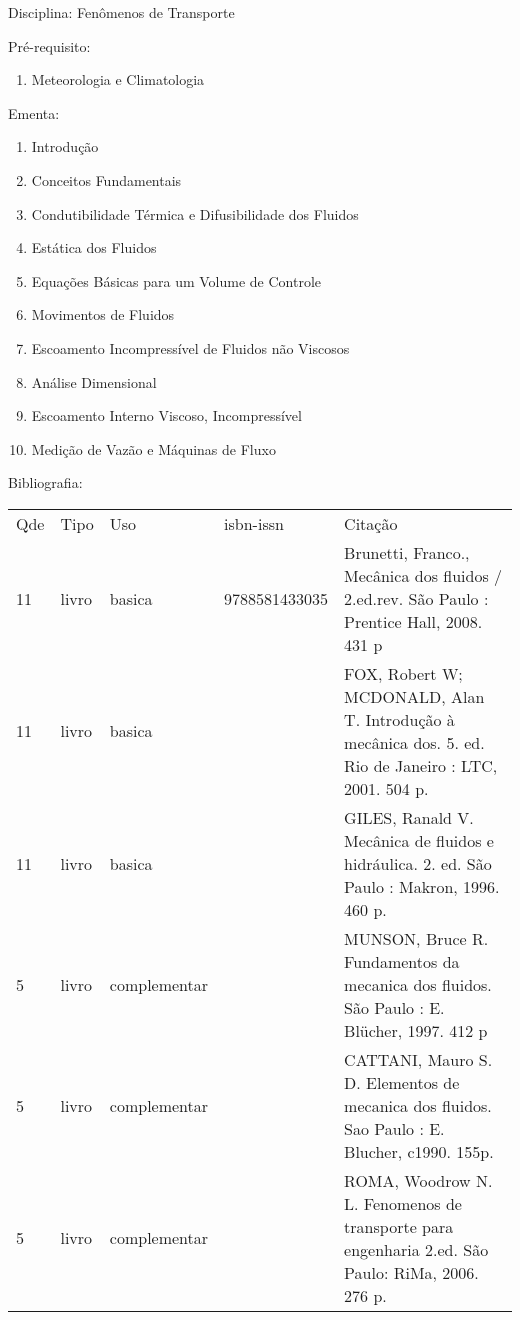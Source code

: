 \documentclass[12pt,a4paper,twoside]{report}
\begin{document}
Disciplina: Fenômenos de Transporte

Pré-requisito:
\begin{enumerate}
\item Meteorologia e Climatologia
\end{enumerate}

Ementa:
\begin{enumerate}
\item Introdução
\item Conceitos Fundamentais
\item Condutibilidade Térmica e Difusibilidade dos Fluidos
\item Estática dos Fluidos
\item Equações Básicas para um Volume de Controle
\item Movimentos de Fluidos
\item Escoamento Incompressível de Fluidos não Viscosos
\item Análise Dimensional
\item Escoamento Interno Viscoso, Incompressível
\item Medição de Vazão e Máquinas de Fluxo
\end{enumerate}

Bibliografia:
\begin{tabular}{lllll}
Qde & Tipo & Uso & isbn-issn & Citação \\
11&livro&basica&9788581433035&Brunetti, Franco., Mecânica dos fluidos / 2.ed.rev. São Paulo : Prentice Hall, 2008. 431 p\\
11&livro&basica&&FOX, Robert W; MCDONALD, Alan T. Introdução à mecânica dos. 5. ed. Rio de Janeiro : LTC, 2001. 504 p.\\
11&livro&basica&&GILES, Ranald V. Mecânica de fluidos e hidráulica. 2. ed. São Paulo : Makron, 1996. 460 p.\\
5&livro&complementar&&MUNSON, Bruce R. Fundamentos da mecanica dos fluidos. São Paulo : E. Blücher, 1997. 412 p\\
5&livro&complementar&&CATTANI, Mauro S. D. Elementos de mecanica dos fluidos. Sao Paulo : E. Blucher, c1990. 155p.\\
5&livro&complementar&&ROMA, Woodrow N. L. Fenomenos de transporte para engenharia 2.ed. São Paulo: RiMa, 2006. 276 p.\\
\end{tabular}
\end{document}
